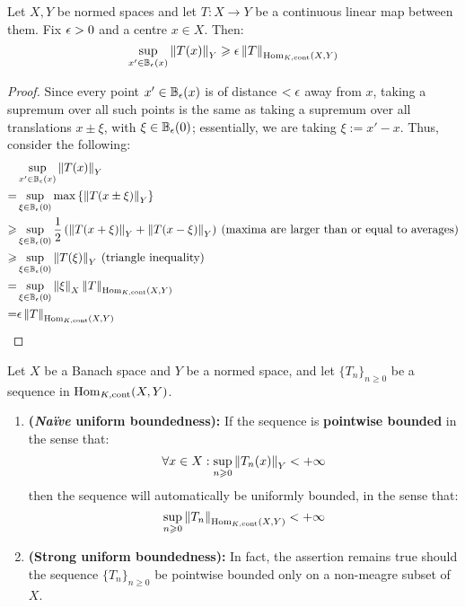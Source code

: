         \begin{lemma} \label{lemma: suprema_of_averages}
            Let $X, Y$ be normed spaces and let $T: X \to Y$ be a continuous linear map between them. Fix $\epsilon > 0$ and a centre $x \in X$. Then:
                $$\sup_{x' \in \mathbb{B}_{\epsilon}(x)} \left\| {T(x)} \right\|_Y \geqslant \epsilon \left\| {T} \right\|_{\mathrm{Hom}_{K, \mathrm{cont}}(X, Y)}$$
        \end{lemma}
            \begin{proof}
                Since every point $x' \in \mathbb{B}_{\epsilon}(x)$ is of distance $< \epsilon$ away from $x$, taking a supremum over all such points is the same as taking a supremum over all translations $x \pm \xi$, with $\xi \in \mathbb{B}_{\epsilon}(0)$; essentially, we are taking $\xi := x' - x$. Thus, consider the following:
                    $$
                        \begin{aligned}
                            & \sup_{x' \in \mathbb{B}_{\epsilon}(x)} \left\| {T(x)} \right\|_Y
                            \\
                            = & \sup_{\xi \in \mathbb{B}_{\epsilon}(0)} \max\left\{ \left\| {T(x \pm \xi)} \right\|_Y \right\}
                            \\
                            \geqslant & \sup_{\xi \in \mathbb{B}_{\epsilon}(0)} \frac12\left( \left\| {T(x + \xi)} \right\|_Y + \left\| {T(x - \xi)} \right\|_Y \right) \: \text{(maxima are larger than or equal to averages)}
                            \\
                            \geqslant & \sup_{\xi \in \mathbb{B}_{\epsilon}(0)} \left\| {T(\xi)} \right\|_Y \: \text{(triangle inequality)}
                            \\
                            = & \sup_{\xi \in \mathbb{B}_{\epsilon}(0)} \left\| {\xi} \right\|_X \left\| {T} \right\|_{\mathrm{Hom}_{K, \mathrm{cont}}(X, Y)}
                            \\
                            = & \epsilon \left\| {T} \right\|_{\mathrm{Hom}_{K, \mathrm{cont}}(X, Y)}
                        \end{aligned}
                    $$
            \end{proof}
        \begin{theorem} \label{theorem: uniform_boundedness}
            Let $X$ be a Banach space and $Y$ be a normed space, and let $\{T_n\}_{n \geq 0}$ be a sequence in $\mathrm{Hom}_{K, \mathrm{cont}}(X, Y)$.
            \begin{enumerate}
                \item \textbf{(\textit{Na\"ive} uniform boundedness):} If the sequence is \textbf{pointwise bounded} in the sense that:
                    $$\forall x \in X: \sup_{n \geqslant 0} \left\| { T_n(x) } \right\|_Y < +\infty$$
                then the sequence will automatically be uniformly bounded, in the sense that:
                    $$\sup_{n \geqslant 0} \left\| {T_n} \right\|_{\mathrm{Hom}_{K, \mathrm{cont}}(X, Y)} < +\infty$$
                \item \textbf{(Strong uniform boundedness):} In fact, the assertion remains true should the sequence $\{T_n\}_{n \geq 0}$ be pointwise bounded only on a non-meagre subset of $X$. 
            \end{enumerate}
        \end{theorem}
